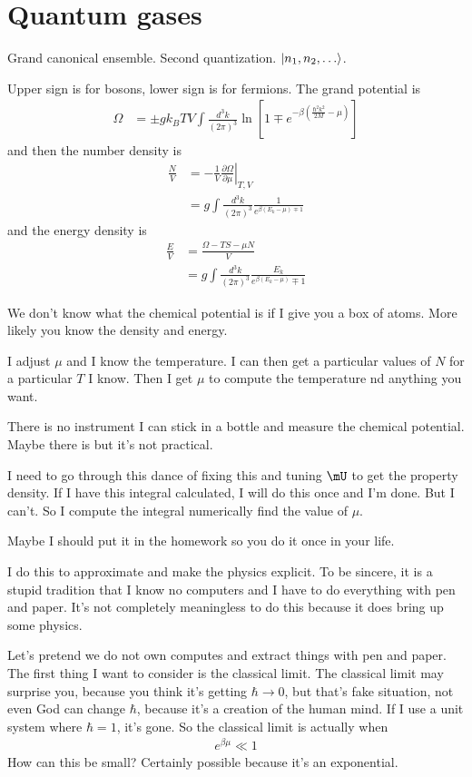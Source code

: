 \section{Quantum gases}
Grand canonical ensemble.
Second quantization. $\ket{n_1,n_2,\ldots}$.

Upper sign is for bosons,
lower sign is for fermions.
The grand potential is
\begin{align}
    \Omega &= \pm gk_B T V
    \int \frac{d^3k}{(2\pi)^3}
    \ln \left[ 
    1 \mp e^{-\beta\left( 
    \frac{\hbar^2 k^2}{2M} - \mu
    \right)}
    \right]
\end{align}
and then the number density is
\begin{align}
    \frac{N}{V} &= - \frac{1}{V}\left.\frac{\partial \Omega}{\partial
    \mu}\right|_{T,V}\\
    &=
    g \int \frac{d^3k}{(2\pi)^3}
    \frac{1}{e^{\beta\left( E_k - \mu \right) \mp 1}}
\end{align}
and the energy density is
\begin{align}
    \frac{E}{V} &=
    \frac{\Omega - TS - \mu N}{V}\\
    &=
    g \int\frac{d^3 k}{(2\pi)^3}
    \frac{E_k}{e^{\beta\left( E_k - \mu \right)} \mp 1}
\end{align}

We don't know what the chemical potential is if I give you a box of atoms.
More likely you know the density and energy.

I adjust $\mu$ and I know the temperature.
I can then get a particular values of $N$ for a particular $T$ I know.
Then I get $\mu$ to compute the temperature nd anything you want.

There is no instrument I can stick in a bottle and measure the chemical
potential.
Maybe there is but it's not practical.

I need to go through this dance of fixing this and tuning $\mU$ to get the
property density.
If I have this integral calculated,
I will do this once and I'm done.
But I can't.
So I compute the integral numerically find the value of $\mu$.

Maybe I should put it in the homework so you do it once in your life.

I do this to approximate and make the physics explicit.
To be sincere,
it is a stupid tradition that I know no computers and I have to do everything
with pen and paper.
It's not completely meaningless to do this because it does bring up some physics.

Let's pretend we do not own computes and extract things with pen and paper.
The first thing I want to consider is the classical limit.
The classical limit may surprise you,
because you think it's getting $\hbar\to 0$,
but that's fake situation,
not even God can change $\hbar$,
because it's a creation of the human mind.
If I use a unit system where $\hbar=1$,
it's gone.
So the classical limit is actually when
\begin{align}
    e^{\beta\mu} \ll 1
\end{align}
How can this be small?
Certainly possible because it's an exponential.

